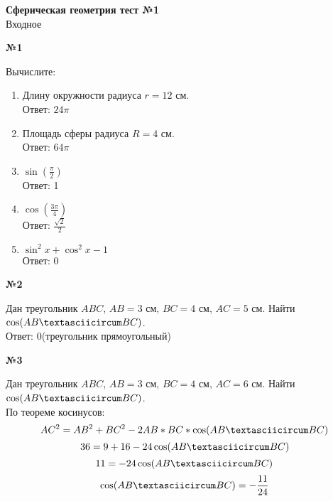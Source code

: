


    \begin{center}
        \textbf{Сферическая геометрия тест №1}\\
        Входное 
    \end{center}

    \begin{center}
        \textbf{№1}
    \end{center}

    Вычислите:
    \begin{enumerate}
        \item Длину окружности радиуса $r = 12$ см.\\
        Ответ: $24\pi$

        \item Площадь сферы радиуса $R = 4$ см.\\
        Ответ: $64\pi$
        \
        \item $\sin\left(\frac{\pi}{2}\right)$\\
        Ответ: 1

        \item $\cos\left(\frac{3\pi}{4}\right)$\\
        Ответ: $\frac{\sqrt {2}}{2}$
        \item $\sin ^ 2 x + \cos ^ 2 x - 1$\\
        Ответ: 0
    \end{enumerate}

    \begin{center}
        \textbf{№2}
    \end{center}

    Дан треугольник $ABC$, $AB = 3$ см, $BC = 4$ см, $AC = 5$ см.
    Найти $\cos(AB \textasciicircum BC)$.\\
    Ответ: 0(треугольник прямоугольный)

    \begin{center}
        \textbf{№3}
    \end{center}

    Дан треугольник $ABC$, $AB = 3$ см, $BC = 4$ см, $AC = 6$ см.
    Найти $\cos(AB \textasciicircum BC)$.\\

    По теореме косинусов:
    \[  AC ^ 2 = AB ^ 2 + BC ^ 2 - 2 AB * BC * \cos(AB \textasciicircum BC) \]
    \[  36 = 9 + 16 - 24\cos(AB \textasciicircum BC) \]
    \[  11 = - 24\cos(AB \textasciicircum BC) \]
    \[ \cos(AB \textasciicircum BC)  = -\frac{11}{24}\]

